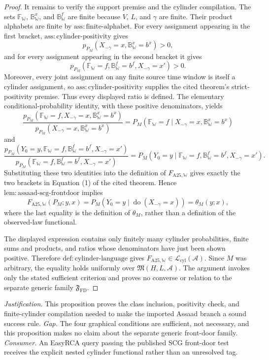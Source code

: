\documentclass{article}
\begin{document}
\begin{proof}
It remains to verify the support premise and the cylinder compilation.  The sets \(\mathbb F_{\mathbb W}\), \(\mathbb B^x_{\mathbb W}\), and \(\mathbb B^f_{\mathbb W}\) are finite because \(V\), \(L\), and \(\gamma\) are finite.  Their product alphabets are finite by \(\mathrm{ass:finite\text{-}alphabet}\).  For every assignment appearing in the first bracket, \(\mathrm{ass:cylinder\text{-}positivity}\) gives
\[
 p_{P_M}(X_{-\gamma}=x,\mathbb B^x_{\mathbb W}=b^x)>0,
\]
and for every assignment appearing in the second bracket it gives
\[
 p_{P_M}(\mathbb F_{\mathbb W}=f,
 \mathbb B^f_{\mathbb W}=b^f,X_{-\gamma}=x')>0.
\]
Moreover, every joint assignment on any finite source time window is itself a cylinder assignment, so \(\mathrm{ass:cylinder\text{-}positivity}\) supplies the cited theorem's strict-positivity premise.  Thus every displayed ratio is defined.  The elementary conditional-probability identity, with these positive denominators, yields
\[
 \frac{p_{P_M}(\mathbb F_{\mathbb W}=f,X_{-\gamma}=x,
 \mathbb B^x_{\mathbb W}=b^x)}
 {p_{P_M}(X_{-\gamma}=x,\mathbb B^x_{\mathbb W}=b^x)}
 =P_M(\mathbb F_{\mathbb W}=f\mid
 X_{-\gamma}=x,\mathbb B^x_{\mathbb W}=b^x)
\]
and
\[
 \frac{p_{P_M}(Y_0=y,\mathbb F_{\mathbb W}=f,
 \mathbb B^f_{\mathbb W}=b^f,X_{-\gamma}=x')}
 {p_{P_M}(\mathbb F_{\mathbb W}=f,
 \mathbb B^f_{\mathbb W}=b^f,X_{-\gamma}=x')}
 =P_M(Y_0=y\mid\mathbb F_{\mathbb W}=f,
 \mathbb B^f_{\mathbb W}=b^f,X_{-\gamma}=x').
\]
Substituting these two identities into the definition of \(F_{\mathrm{A25},\mathbb W}\) gives exactly the two brackets in Equation (1) of the cited theorem.  Hence \(\mathrm{lem:assaad\text{-}scg\text{-}frontdoor}\) implies
\[
 F_{\mathrm{A25},\mathbb W}(P_M;y,x)
 =P_M(Y_0=y\mid\operatorname{do}(X_{-\gamma}=x))
 =\theta_M(y;x),
\]
where the last equality is the definition of \(\theta_M\), rather than a definition of the observed-law functional.

The displayed expression contains only finitely many cylinder probabilities, finite sums and products, and ratios whose denominators have just been shown positive.  Therefore \(\mathrm{def:cylinder\text{-}language}\) gives \(F_{\mathrm{A25},\mathbb W}\in\mathcal L_{\mathrm{cyl}}(\mathcal A)\).  Since \(M\) was arbitrary, the equality holds uniformly over \(\mathfrak M(H,L,\mathcal A)\).  The argument invokes only the stated sufficient criterion and proves no converse or relation to the separate generic family \(\mathfrak F_{\mathrm{FD}}\).
\end{proof}
\par\smallskip\noindent \textit{Justification.} This proposition proves the class inclusion, positivity check, and finite-cylinder compilation needed to make the imported Assaad branch a sound success rule. \textit{Gap.} The four graphical conditions are sufficient, not necessary, and this proposition makes no claim about the separate generic front-door family. \textit{Consumer.} An EasyRCA query passing the published SCG front-door test receives the explicit nested cylinder functional rather than an unresolved tag.
\end{document}
